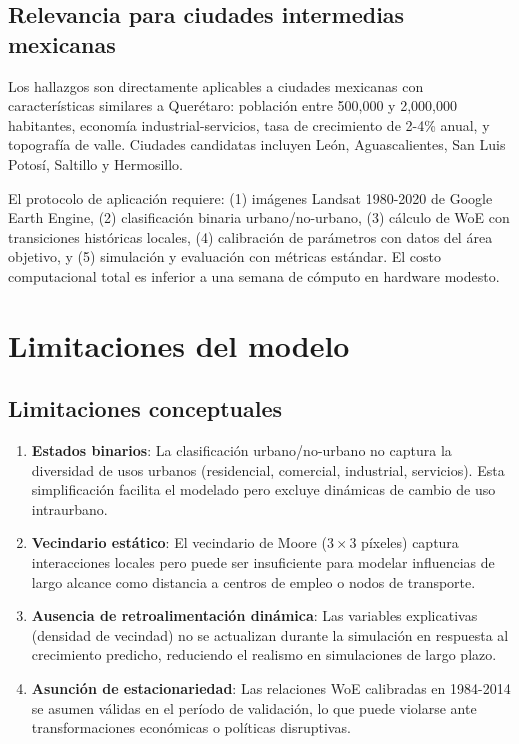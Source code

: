 \subsection{Relevancia para ciudades intermedias mexicanas}

Los hallazgos son directamente aplicables a ciudades mexicanas con características similares a Querétaro: población entre 500{,}000 y 2{,}000{,}000 habitantes, economía industrial-servicios, tasa de crecimiento de 2-4\% anual, y topografía de valle. Ciudades candidatas incluyen León, Aguascalientes, San Luis Potosí, Saltillo y Hermosillo.

El protocolo de aplicación requiere: (1) imágenes Landsat 1980-2020 de Google Earth Engine, (2) clasificación binaria urbano/no-urbano, (3) cálculo de WoE con transiciones históricas locales, (4) calibración de parámetros con datos del área objetivo, y (5) simulación y evaluación con métricas estándar. El costo computacional total es inferior a una semana de cómputo en hardware modesto.

\section{Limitaciones del modelo}

\subsection{Limitaciones conceptuales}

\begin{enumerate}
	\item \textbf{Estados binarios}: La clasificación urbano/no-urbano no captura la diversidad de usos urbanos (residencial, comercial, industrial, servicios). Esta simplificación facilita el modelado pero excluye dinámicas de cambio de uso intraurbano.

	\item \textbf{Vecindario estático}: El vecindario de Moore ($3 \times 3$ píxeles) captura interacciones locales pero puede ser insuficiente para modelar influencias de largo alcance como distancia a centros de empleo o nodos de transporte.

	\item \textbf{Ausencia de retroalimentación dinámica}: Las variables explicativas (densidad de vecindad) no se actualizan durante la simulación en respuesta al crecimiento predicho, reduciendo el realismo en simulaciones de largo plazo.

	\item \textbf{Asunción de estacionariedad}: Las relaciones WoE calibradas en 1984-2014 se asumen válidas en el período de validación, lo que puede violarse ante transformaciones económicas o políticas disruptivas.
\end{enumerate}

